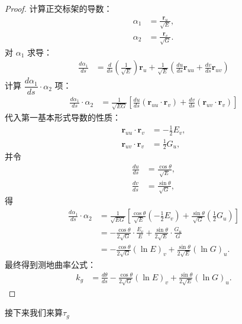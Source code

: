 \documentclass[lang=cn,10pt,thmcnt=section]{elegantbook}
\begin{document}
\begin{proof}
    计算正交标架的导数：
    \begin{align*}
    \alpha_1 &= \frac{\mathbf{r}_u}{\sqrt{E}}, \\
    \alpha_2 &= \frac{\mathbf{r}_v}{\sqrt{G}}.
    \end{align*}
    对 \(\alpha_1\) 求导：
    \begin{align*}
    \frac{d\alpha_1}{ds} 
    &= \frac{d}{ds}\left(\frac{1}{\sqrt{E}}\right) \mathbf{r}_u 
    + \frac{1}{\sqrt{E}} \left( \frac{du}{ds} \mathbf{r}_{uu} + \frac{dv}{ds} \mathbf{r}_{uv} \right)
    \end{align*}
    计算 \(\dfrac{d\alpha_1}{ds} \cdot \alpha_2\) 项：
    \begin{align*}
    \frac{d\alpha_1}{ds} \cdot \alpha_2 
    &= \frac{1}{\sqrt{EG}} \left[ \frac{du}{ds} (\mathbf{r}_{uu} \cdot \mathbf{r}_v) 
    + \frac{dv}{ds} (\mathbf{r}_{uv} \cdot \mathbf{r}_v) \right]
    \end{align*}
    代入第一基本形式导数的性质：
    \begin{align*}
    \mathbf{r}_{uu} \cdot \mathbf{r}_v &= -\frac{1}{2} E_v, \\
    \mathbf{r}_{uv} \cdot \mathbf{r}_v &= \frac{1}{2} G_u,
    \end{align*}
    并令
    \begin{align*}
    \frac{du}{ds} &= \frac{\cos\theta}{\sqrt{E}}, \\
    \frac{dv}{ds} &= \frac{\sin\theta}{\sqrt{G}},
    \end{align*}
    得
    \begin{align*}
    \frac{d\alpha_1}{ds} \cdot \alpha_2 
    &= \frac{1}{\sqrt{EG}} \left[ 
      \frac{\cos\theta}{\sqrt{E}} \left( -\frac{1}{2} E_v \right) 
    + \frac{\sin\theta}{\sqrt{G}} \left( \frac{1}{2} G_u \right) 
    \right] \\
    &= -\frac{\cos\theta}{2\sqrt{G}} \cdot \frac{E_v}{E} 
    + \frac{\sin\theta}{2\sqrt{E}} \cdot \frac{G_u}{G} \\
    &= -\frac{\cos\theta}{2\sqrt{G}} (\ln E)_v 
    + \frac{\sin\theta}{2\sqrt{E}} (\ln G)_u.
    \end{align*}
    最终得到测地曲率公式：
    \begin{align*}
    k_g &= \frac{d\theta}{ds} 
    - \frac{\cos\theta}{2\sqrt{G}} (\ln E)_v 
    + \frac{\sin\theta}{2\sqrt{E}} (\ln G)_u.
    \end{align*}
    
\end{proof}

接下来我们来算$\tau_g$
\end{document}
